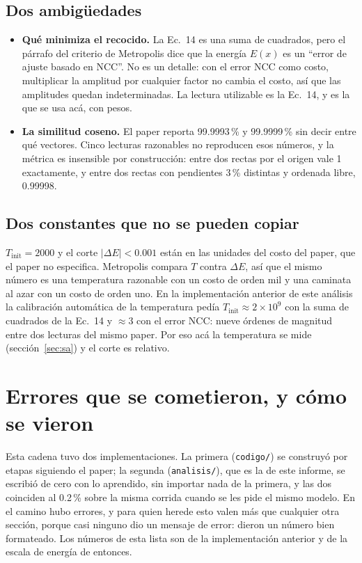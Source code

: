 \documentclass[11pt,a4paper]{article}
\begin{document}
\subsection{Dos ambigüedades}

\begin{itemize}
\item \textbf{Qué minimiza el recocido.} La Ec.~14 es una suma de cuadrados,
      pero el párrafo del criterio de Metropolis dice que la energía $E(x)$
      es un ``error de ajuste basado en NCC''. No es un detalle: con el error
      NCC como costo, multiplicar la amplitud por cualquier factor no cambia
      el costo, así que las amplitudes quedan indeterminadas. La lectura
      utilizable es la Ec.~14, y es la que se usa acá, con pesos.
\item \textbf{La similitud coseno.} El paper reporta 99.9993\,\% y
      99.9999\,\% sin decir entre qué vectores. Cinco lecturas razonables no
      reproducen esos números, y la métrica es insensible por construcción:
      entre dos rectas por el origen vale 1 exactamente, y entre dos rectas
      con pendientes 3\,\% distintas y ordenada libre, 0.99998.
\end{itemize}

\subsection{Dos constantes que no se pueden copiar}

$T_{\text{init}} = 2000$ y el corte $|\Delta E| < 0.001$ están en las
unidades del costo del paper, que el paper no especifica. Metropolis compara
$T$ contra $\Delta E$, así que el mismo número es una temperatura razonable
con un costo de orden mil y una caminata al azar con un costo de orden uno.
En la implementación anterior de este análisis la calibración automática de
la temperatura pedía $T_{\text{init}} \approx 2\times10^{9}$ con la suma de
cuadrados de la Ec.~14 y $\approx 3$ con el error NCC: nueve órdenes de
magnitud entre dos lecturas del mismo paper. Por eso acá la temperatura se
mide (sección~\ref{sec:sa}) y el corte es relativo.

\section{Errores que se cometieron, y cómo se vieron}
\label{ap:historia}

Esta cadena tuvo dos implementaciones. La primera (\texttt{codigo/}) se
construyó por etapas siguiendo el paper; la segunda (\texttt{analisis/}),
que es la de este informe, se escribió de cero con lo aprendido, sin importar
nada de la primera, y las dos coinciden al 0.2\,\% sobre la misma corrida
cuando se les pide el mismo modelo. En el camino hubo errores, y para quien
herede esto valen más que cualquier otra sección, porque casi ninguno dio un
mensaje de error: dieron un número bien formateado. Los números de esta lista
son de la implementación anterior y de la escala de energía de entonces.
\end{document}

